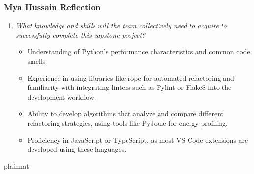 \documentclass[12pt]{article}
\begin{document}
\subsubsection*{Mya Hussain Reflection}
\begin{enumerate}
  \item \textit{What knowledge and skills will the team collectively need to acquire to successfully complete this capstone project?}

    \begin{itemize}
      \item Understanding of Python's performance characteristics and common code smells
      \item Experience in using libraries like rope for automated refactoring and familiarity with integrating linters such as Pylint or Flake8 into the development workflow.
      \item Ability to develop algorithms that analyze and compare different refactoring strategies, using tools like PyJoule for energy profiling.
      \item  Proficiency in JavaScript or TypeScript, as most VS Code extensions are developed using these languages.
    \end{itemize}
 
\end{enumerate}

 {plainnat}

\end{document}
